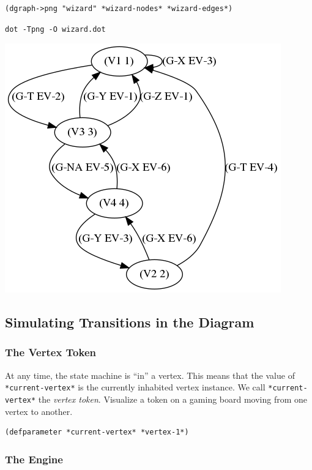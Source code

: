 \documentclass[10pt,oneside,x11names]{article}
\begin{document}
\begin{verbatim}
(dgraph->png "wizard" *wizard-nodes* *wizard-edges*)
\end{verbatim}

\begin{verbatim}
dot -Tpng -O wizard.dot
\end{verbatim}
\begin{center}
\includegraphics[width=.9\linewidth]{wizard.dot.png}
\end{center}

\subsection{Simulating Transitions in the Diagram}
\label{sec:org53d5139}

\subsubsection{The Vertex Token}
\label{sec:org61f86f2}

At any time, the state machine is ``in'' a vertex. This means that the value
of \texttt{*current-vertex*} is the currently inhabited vertex instance. We call
\texttt{*current-vertex*} the \emph{vertex token}. Visualize a token on a gaming board
moving from one vertex to another.

\begin{verbatim}
(defparameter *current-vertex* *vertex-1*)
\end{verbatim}

\subsubsection{The Engine}
\label{sec:orgfdd9f97}
\end{document}
